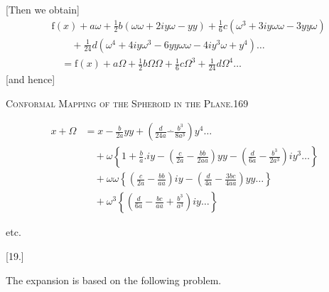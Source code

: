 [Then we obtain]
\[
\begin{aligned}
&\mathrm f(x)+a\omega+\tfrac12b(\omega\omega+2iy\omega-yy)+\tfrac16c(\omega^3+3iy\omega\omega-3yy\omega)\\
&\qquad+\tfrac1{24}d(\omega^4+4iy\omega^3-6yy\omega\omega-4iy^3\omega+y^4)\ldots\\
&\quad=\mathrm f(x)+a\Omega+\tfrac12b\Omega\Omega+\tfrac16c\Omega^3+\tfrac1{24}d\Omega^4\ldots
\end{aligned}
\]
[and hence]
\par\endgroup
\clearpage
\noindent\mbox{}\hfill\textsc{Conformal Mapping of the Spheroid in the Plane.}\hfill169\par\medskip
\begingroup\small
\[
\begin{aligned}
x+\Omega&=x-\frac b{2a}yy+\left(\frac d{24a}\mathbin{\overset{\scriptscriptstyle .}{-}}\frac{b^3}{8a^3}\right)y^4\ldots\\
&\quad+\omega\left\{1+\frac ba.iy-\left(\frac c{2a}-\frac{bb}{2aa}\right)yy-\left(\frac d{6a}-\frac{b^3}{2a^3}\right)iy^3\ldots\right\}\\
&\quad+\omega\omega\left\{\left(\frac c{2a}-\frac{bb}{aa}\right)iy-\left(\frac d{4a}-\frac{3bc}{4aa}\right)yy\ldots\right\}\\
&\quad+\omega^3\left\{\left(\frac d{6a}-\frac{bc}{aa}+\frac{b^3}{a^3}\right)iy\ldots\right\}
\end{aligned}
\]
\begin{center}etc.\end{center}
\bigskip
\begin{center}[19.]\end{center}
The expansion is based on the following problem.

